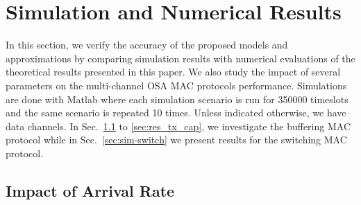 \documentclass[12pt,journal,oneside,onecolumn]{IEEEtran}
\begin{document}
\section{Simulation and Numerical Results}
\label{sec:simulation}

In this section, we verify the accuracy of the proposed 
models and approximations by comparing simulation results with numerical evaluations
of the theoretical results presented in this paper. We also study the impact of several parameters on the
multi-channel OSA MAC protocols performance.
Simulations are done with Matlab where each simulation scenario is 
run for 350000 timeslots and the same scenario is repeated 10 times.
Unless indicated otherwise, we have  data channels. In Sec.~\ref{sec:res_arr_rate} to \ref{sec:res_tx_cap}, we investigate
the buffering MAC protocol while in Sec.~\ref{sec:sim-switch} we present results for the switching MAC protocol.

\subsection{Impact of Arrival Rate}
\label{sec:res_arr_rate}
\end{document}
